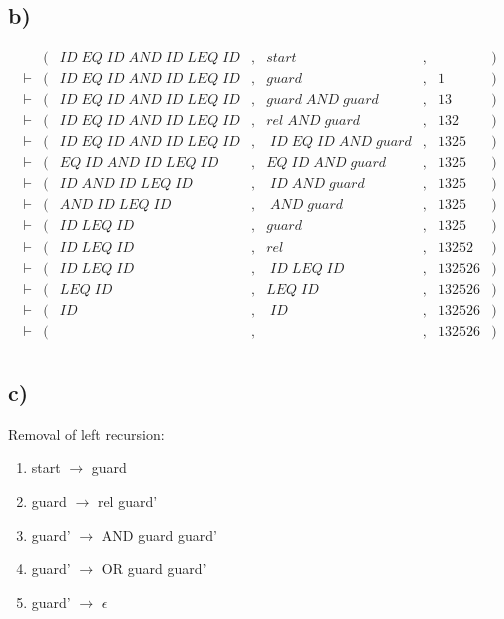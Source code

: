 \subsection*{b)}

\begin{equation*}
  \begin{aligned}
   &(&ID\;EQ\;ID\;AND\;ID\;LEQ\;ID&,& start&,& &) \\
\vdash &(&ID\;EQ\;ID\;AND\;ID\;LEQ\;ID&,& guard&,& 1&) \\
\vdash &(&ID\;EQ\;ID\;AND\;ID\;LEQ\;ID&,& guard\;AND\;guard&,& 13&) \\
\vdash &(&ID\;EQ\;ID\;AND\;ID\;LEQ\;ID&,& rel\;AND\;guard&,& 132&) \\
\vdash &(&ID\;EQ\;ID\;AND\;ID\;LEQ\;ID&,&\;ID\;EQ\;ID\;AND\;guard&,& 1325&) \\
\vdash &(&EQ\;ID\;AND\;ID\;LEQ\;ID&,& EQ\;ID\;AND\;guard&,& 1325&) \\
\vdash &(&ID\;AND\;ID\;LEQ\;ID&,&\;ID\;AND\;guard&,& 1325&) \\
\vdash &(&AND\;ID\;LEQ\;ID&,&\;AND\;guard&,& 1325&) \\
\vdash &(&ID\;LEQ\;ID&,& guard&,& 1325&) \\
\vdash &(&ID\;LEQ\;ID&,& rel&,& 13252&) \\
\vdash &(&ID\;LEQ\;ID&,&\;ID\;LEQ\;ID&,& 132526&) \\
\vdash &(&LEQ\;ID&,& LEQ\;ID&,& 132526&) \\
\vdash &(&ID&,&\;ID&,& 132526&) \\
\vdash &(&&,& &,& 132526&) \\
\end{aligned}
\end{equation*}

\subsection*{c)}
Removal of left recursion:

\begin{enumerate}
\item start $\rightarrow$ guard
\item guard $\rightarrow$ rel guard'
\item guard' $\rightarrow$ AND guard guard'
\item guard' $\rightarrow$ OR guard guard'
\item guard' $\rightarrow$  $\epsilon$
\end{enumerate}

